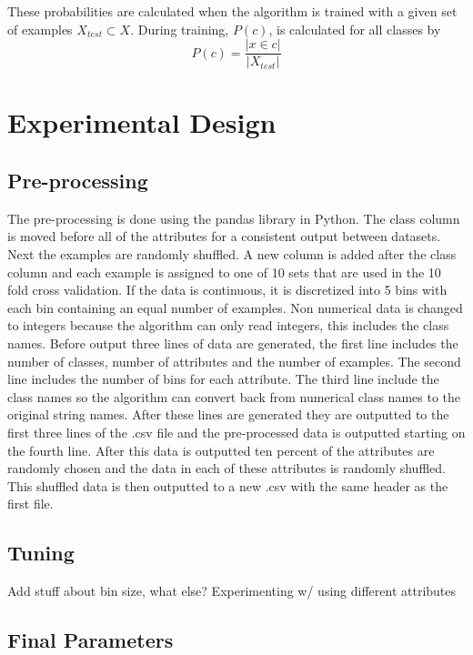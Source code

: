 \documentclass[twoside,11pt]{article}
\begin{document}
These probabilities are calculated when the algorithm is trained with a given set of examples $X_{test} \subset X$. During training, $P(c)$, is calculated for all classes by
$$P(c) = \frac{|x \in c|}{|X_{test}|}$$ 

\section{Experimental Design}

\subsection{Pre-processing}

The pre-processing is done using the pandas library in Python. The class column is moved before all of the attributes for a consistent output between datasets. Next the examples are randomly shuffled. A new column is added after the class column and each example is assigned to one of 10 sets that are used in the 10 fold cross validation. If the data is continuous, it is discretized into 5 bins with each bin containing an equal number of examples. Non numerical data is changed to integers because the algorithm can only read integers, this includes the class names. Before output three lines of data are generated, the first line includes the number of classes, number of attributes and the number of examples. The second line includes the number of bins for each attribute. The third line include the class names so the algorithm can convert back from numerical class names to the original string names. After these lines are generated they are outputted to the first three lines of the .csv file and the pre-processed data is outputted starting on the fourth line. After this data is outputted ten percent of the attributes are randomly chosen and the data in each of these attributes is randomly shuffled. This shuffled data is then outputted to a new .csv with the same header as the first file.  

\subsection{Tuning}

Add stuff about bin size, what else? \newline
Experimenting w/ using different attributes

\subsection{Final Parameters}
\end{document}
